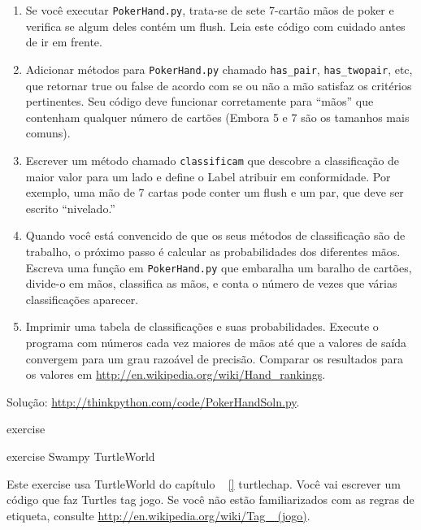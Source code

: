 \documentclass[10pt]{book}
\begin{document}
\begin{exercise}
\begin{v erbatim}
\begin{}
\begin{enumerate}
\begin{description}
\item[{\tt PokerHand.py}]: Uma implementação incompleta de uma classe
que representa uma mão de poker, e um código que testa-lo.

\end{description}
%
\item Se você executar {\tt PokerHand.py}, trata-se de sete 7-cartão mãos de poker
e verifica se algum deles contém um flush. Leia este
código com cuidado antes de ir em frente.

\item Adicionar métodos para {\tt PokerHand.py} chamado \verb "has_pair",
\Verb "has_twopair", etc, que retornar true ou false de acordo com
se ou não a mão satisfaz os critérios pertinentes. Seu código deve
funcionar corretamente para ``mãos'' que contenham qualquer número de cartões
(Embora 5 e 7 são os tamanhos mais comuns).

\item Escrever um método chamado {\tt classificam} que descobre
a classificação de maior valor para um lado e define o
{Label \tt} atribuir em conformidade. Por exemplo, uma mão de 7 cartas
pode conter um flush e um par, que deve ser escrito ``nivelado.''

\item Quando você está convencido de que os seus métodos de classificação são
de trabalho, o próximo passo é calcular as probabilidades dos diferentes
mãos. Escreva uma função em {\tt PokerHand.py} que embaralha um baralho de
cartões, divide-o em mãos, classifica as mãos, e conta o
número de vezes que várias classificações aparecer.

\item Imprimir uma tabela de classificações e suas probabilidades.
Execute o programa com números cada vez maiores de mãos até que a
valores de saída convergem para um grau razoável de precisão. Comparar
os resultados para os valores em \url{http://en.wikipedia.org/wiki/Hand_rankings}.

\end{enumerate}

Solução: \url{http://thinkpython.com/code/PokerHandSoln.py}.
\end{} exercise


\begin{} exercise
\index{} Swampy
\index{} TurtleWorld

Este exercise usa TurtleWorld do capítulo ~ \ref {} turtlechap.
Você vai escrever um código que faz Turtles tag jogo. Se você
não estão familiarizados com as regras de etiqueta, consulte
\url{http://en.wikipedia.org/wiki/Tag_ (jogo)}.


\end{}
\end{v erbatim}
\end{exercise}
\end{document}
